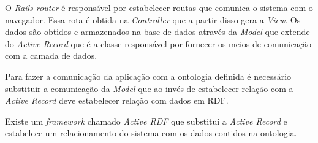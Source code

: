 O \textit{Rails router} é responsável por estabelecer routas que comunica o sistema com o navegador. Essa rota é obtida
na \textit{Controller} que a partir disso gera a \textit{View}. Os dados são obtidos e armazenados na base de dados através da \textit{Model}
que extende do \textit{Active Record} que é a classe responsável por fornecer os meios de comunicação com a camada de dados.

Para fazer a comunicação da aplicação com a ontologia definida é necessário substituir a comunicação da \textit{Model} que ao invés
de estabelecer relação com a \textit{Active Record} deve estabelecer relação com dados em RDF.

Existe um \textit{framework} chamado \textit{Active RDF} \footnotemark[1] que substitui a \textit{Active Record} e estabelece um relacionamento
do sistema com os dados contidos na ontologia. 

